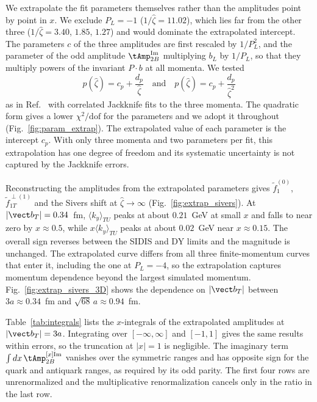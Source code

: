 We extrapolate the fit parameters themselves rather than the amplitudes point by point in $x$. We exclude $P_L=-1$ ($1/\hat\zeta=11.02$), which lies far from the other three ($1/\hat\zeta=3.40$, $1.85$, $1.27$) and would dominate the extrapolated intercept. The parameters $c$ of the three amplitudes are first rescaled by $1/P_L^2$, and the parameter of the odd amplitude $\tAmp_{2B}^{\text{Im}}$ multiplying $b_L$ by $1/P_L$, so that they multiply powers of the invariant $P\cdot b$ at all momenta. We tested
\begin{equation}
p(\hat\zeta)=c_p+\frac{d_p}{\hat\zeta}\quad\text{and}\quad p(\hat\zeta)=c_p+\frac{d_p}{\hat\zeta^{2}}
\label{eq:zeta_ansatz}
\end{equation}
as in Ref.~\cite{Musch:2011er} with correlated Jackknife fits to the three momenta. The quadratic form gives a lower $\chi^2/\text{dof}$ for the parameters and we adopt it throughout (Fig.~\ref{fig:param_extrap}). The extrapolated value of each parameter is the intercept $c_p$. With only three momenta and two parameters per fit, this extrapolation has one degree of freedom and its systematic uncertainty is not captured by the Jackknife errors.

Reconstructing the amplitudes from the extrapolated parameters gives $\tilde f_1^{(0)}$, $\tilde f_{1T}^{\perp(1)}$ and the Sivers shift at $\hat\zeta\to\infty$ (Fig.~\ref{fig:extrap_sivers}). At $|\vect b_T|=0.34$~fm, $\langle k_y\rangle_{TU}$ peaks at about $0.21$~GeV at small $x$ and falls to near zero by $x\approx0.5$, while $x\langle k_y\rangle_{TU}$ peaks at about $0.02$~GeV near $x\approx0.15$. The overall sign reverses between the SIDIS and DY limits and the magnitude is unchanged. The extrapolated curve differs from all three finite-momentum curves that enter it, including the one at $P_L=-4$, so the extrapolation captures momentum dependence beyond the largest simulated momentum. Fig.~\ref{fig:extrap_sivers_3D} shows the dependence on $|\vect b_T|$ between $3a\approx0.34$~fm and $\sqrt{68}\,a\approx0.94$~fm.

Table~\ref{tab:integrals} lists the $x$-integrals of the extrapolated amplitudes at $|\vect b_T|=3a$. Integrating over $[-\infty,\infty]$ and $[-1,1]$ gives the same results within errors, so the truncation at $|x|=1$ is negligible. The imaginary term $\int dx\,\tAmp^{[x]\text{Im}}_{2B}$ vanishes over the symmetric ranges and has opposite sign for the quark and antiquark ranges, as required by its odd parity. The first four rows are unrenormalized and the multiplicative renormalization cancels only in the ratio in the last row.

